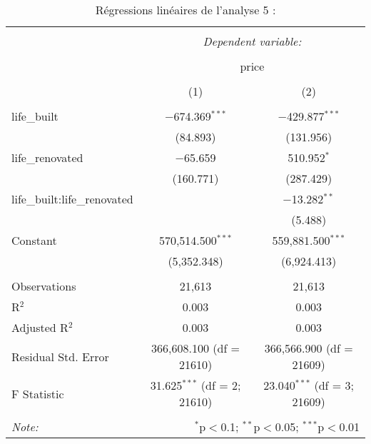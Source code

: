 \documentclass[
  11pt,
  french,
]{article}
\begin{document}
\begin{table}[!htbp] \centering 
  \caption{Régressions linéaires de l'analyse 5 :} 
  \label{} 
\small 
\begin{tabular}{@{\extracolsep{1pt}}lcc} 
\\[-1.8ex]\hline 
\hline \\[-1.8ex] 
 & \multicolumn{2}{c}{\textit{Dependent variable:}} \\ 
\cline{2-3} 
\\[-1.8ex] & \multicolumn{2}{c}{price} \\ 
\\[-1.8ex] & (1) & (2)\\ 
\hline \\[-1.8ex] 
 life\_built & $-$674.369$^{***}$ & $-$429.877$^{***}$ \\ 
  & (84.893) & (131.956) \\ 
  life\_renovated & $-$65.659 & 510.952$^{*}$ \\ 
  & (160.771) & (287.429) \\ 
  life\_built:life\_renovated &  & $-$13.282$^{**}$ \\ 
  &  & (5.488) \\ 
  Constant & 570,514.500$^{***}$ & 559,881.500$^{***}$ \\ 
  & (5,352.348) & (6,924.413) \\ 
 \hline \\[-1.8ex] 
Observations & 21,613 & 21,613 \\ 
R$^{2}$ & 0.003 & 0.003 \\ 
Adjusted R$^{2}$ & 0.003 & 0.003 \\ 
Residual Std. Error & 366,608.100 (df = 21610) & 366,566.900 (df = 21609) \\ 
F Statistic & 31.625$^{***}$ (df = 2; 21610) & 23.040$^{***}$ (df = 3; 21609) \\ 
\hline 
\hline \\[-1.8ex] 
\textit{Note:}  & \multicolumn{2}{r}{$^{*}$p$<$0.1; $^{**}$p$<$0.05; $^{***}$p$<$0.01} \\ 
\end{tabular} 
\end{table}
\end{document}
